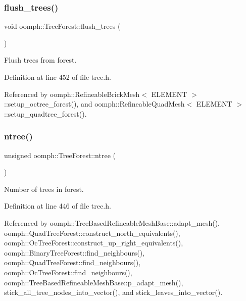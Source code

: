 \mbox{\label{classoomph_1_1TreeForest_a38e8313e3b672bdcba26be8a02cf7615}} 
\subsubsection{\texorpdfstring{flush\+\_\+trees()}{flush\_trees()}}
{\footnotesize\ttfamily void oomph\+::\+Tree\+Forest\+::flush\+\_\+trees (\begin{DoxyParamCaption}{ }\end{DoxyParamCaption})\hspace{0.3cm}{\ttfamily [inline]}}



Flush trees from forest. 



Definition at line 452 of file tree.\+h.



Referenced by oomph\+::\+Refineable\+Brick\+Mesh$<$ E\+L\+E\+M\+E\+N\+T $>$\+::setup\+\_\+octree\+\_\+forest(), and oomph\+::\+Refineable\+Quad\+Mesh$<$ E\+L\+E\+M\+E\+N\+T $>$\+::setup\+\_\+quadtree\+\_\+forest().

\mbox{\label{classoomph_1_1TreeForest_a6796a34cf1211f554a59055ff5765863}} 
\subsubsection{\texorpdfstring{ntree()}{ntree()}}
{\footnotesize\ttfamily unsigned oomph\+::\+Tree\+Forest\+::ntree (\begin{DoxyParamCaption}{ }\end{DoxyParamCaption})\hspace{0.3cm}{\ttfamily [inline]}}



Number of trees in forest. 



Definition at line 446 of file tree.\+h.



Referenced by oomph\+::\+Tree\+Based\+Refineable\+Mesh\+Base\+::adapt\+\_\+mesh(), oomph\+::\+Quad\+Tree\+Forest\+::construct\+\_\+north\+\_\+equivalents(), oomph\+::\+Oc\+Tree\+Forest\+::construct\+\_\+up\+\_\+right\+\_\+equivalents(), oomph\+::\+Binary\+Tree\+Forest\+::find\+\_\+neighbours(), oomph\+::\+Quad\+Tree\+Forest\+::find\+\_\+neighbours(), oomph\+::\+Oc\+Tree\+Forest\+::find\+\_\+neighbours(), oomph\+::\+Tree\+Based\+Refineable\+Mesh\+Base\+::p\+\_\+adapt\+\_\+mesh(), stick\+\_\+all\+\_\+tree\+\_\+nodes\+\_\+into\+\_\+vector(), and stick\+\_\+leaves\+\_\+into\+\_\+vector().

